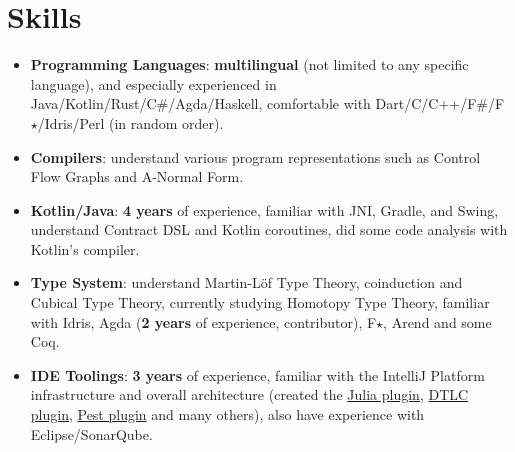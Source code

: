 \documentclass{resume}
\begin{document}


\section{Skills}
\begin{itemize}[parsep=0.25ex]
  \item \textbf{Programming Languages}:
    \textbf{multilingual} (not limited to any specific language),
    and especially experienced in Java/Kotlin/Rust/C\#/Agda/Haskell,
    comfortable with Dart/C/C++/F\#/F$\star$/Idris/Perl (in random order).

  \item \textbf{Compilers}:
    understand various program representations such as Control Flow Graphs
    and A-Normal Form.

  \item \textbf{Kotlin/Java}:
    \textbf{4 years} of experience,
    familiar with JNI, Gradle, and Swing,
    understand Contract DSL and Kotlin coroutines,
    did some code analysis with Kotlin's compiler.

  \item \textbf{Type System}:
    understand Martin-L\"{o}f Type Theory, coinduction and Cubical Type Theory,
    currently studying Homotopy Type Theory,
    familiar with Idris, Agda (\textbf{2 years} of experience, contributor), F$\star$, Arend and some Coq.


  \item \textbf{IDE Toolings}:
    \textbf{3 years} of experience,
    familiar with the IntelliJ Platform infrastructure and overall
    architecture (created the
    \href{https://plugins.jetbrains.com/plugin/10413}
         {Julia plugin},
    \href{https://plugins.jetbrains.com/plugin/12176}
         {DTLC plugin},
    \href{https://plugins.jetbrains.com/plugin/12046}
         {Pest plugin} and many others), also have experience with Eclipse/SonarQube.


\end{itemize}
\end{document}
